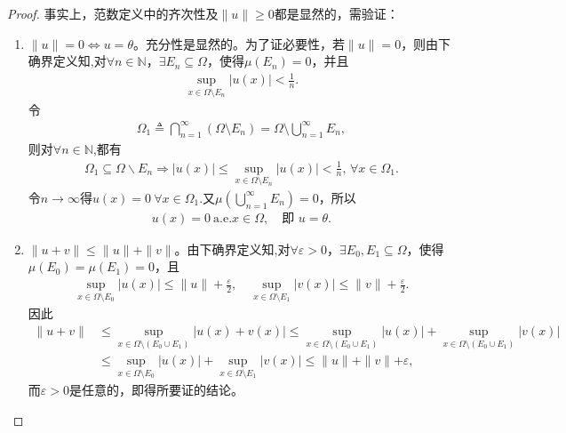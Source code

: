 \documentclass[../../main.tex]{subfiles}%
\begin{document}
\begin{proof}
事实上，范数定义中的齐次性及$\|u\|\geqslant0$都是显然的，需验证：
\begin{enumerate}[(1)]
\item $\|u\|=0\iff u=\theta$。充分性是显然的。为了证必要性，若$\|u\|=0$，则由下确界定义知,对$\forall n\in\mathbb{N}$，$\exists E_n\subseteq\Omega$，使得$\mu(E_n)=0$，并且
\begin{align*}
\sup_{x\in\Omega\setminus E_n}|u(x)|<\frac{1}{n}.
\end{align*}
令
\begin{align*}
\Omega_1\triangleq\bigcap_{n=1}^\infty(\Omega\setminus E_n)=\Omega\setminus\bigcup_{n=1}^\infty E_n,
\end{align*}
则对$\forall n\in\mathbb{N}$,都有
\begin{align*}
\Omega _1\subseteq \Omega \backslash E_n\Longrightarrow |u(x)|\leqslant \mathop {\mathrm{sup}} \limits_{x\in \Omega \setminus E_n}|u(x)|<\frac{1}{n},\,\forall x\in \Omega _1.
\end{align*}
令$n\to \infty$得$u(x)=0\ \forall x\in\Omega_1$.又$\mu\left(\bigcup_{n=1}^\infty E_n\right)=0$，所以
\begin{align*}
u(x)=0\ \text{a.e.}x\in\Omega,\quad\text{即 }u=\theta.
\end{align*}
\item $\|u+v\|\leqslant\|u\|+\|v\|$。由下确界定义知,对$\forall\varepsilon>0$，$\exists E_0,E_1\subseteq\Omega$，使得$\mu(E_0)=\mu(E_1)=0$，且
\begin{align*}
\sup_{x\in\Omega\setminus E_0}|u(x)|\leqslant\|u\|+\frac{\varepsilon}{2},\quad
\sup_{x\in\Omega\setminus E_1}|v(x)|\leqslant\|v\|+\frac{\varepsilon}{2}.
\end{align*}
因此
\begin{align*}
\parallel u+v\parallel &\leqslant \mathop {\mathrm{sup}} \limits_{x\in \Omega \setminus (E_0\cup E_1)}|u(x)+v(x)|\leqslant \mathop {\mathrm{sup}} \limits_{x\in \Omega \setminus (E_0\cup E_1)}|u(x)|+\mathop {\mathrm{sup}} \limits_{x\in \Omega \setminus (E_0\cup E_1)}|v(x)|
\\
&\leqslant \mathop {\mathrm{sup}} \limits_{x\in \Omega \setminus E_0}|u(x)|+\mathop {\mathrm{sup}} \limits_{x\in \Omega \setminus E_1}|v(x)|\leqslant \parallel u\parallel +\parallel v\parallel +\varepsilon ,
\end{align*}
而$\varepsilon>0$是任意的，即得所要证的结论。
\end{enumerate}


\end{proof}
\end{document}
